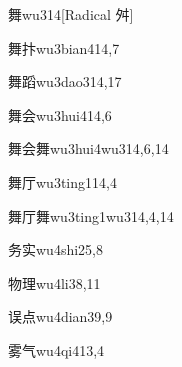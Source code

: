 \begin{verbete}{舞}{wu3}{14}[Radical 舛]
\end{verbete}

\begin{verbete}{舞抃}{wu3bian4}{14,7}
\end{verbete}

\begin{verbete}{舞蹈}{wu3dao3}{14,17}
\end{verbete}

\begin{verbete}{舞会}{wu3hui4}{14,6}
\end{verbete}

\begin{verbete}{舞会舞}{wu3hui4wu3}{14,6,14}
\end{verbete}

\begin{verbete}{舞厅}{wu3ting1}{14,4}
\end{verbete}

\begin{verbete}{舞厅舞}{wu3ting1wu3}{14,4,14}
\end{verbete}

\begin{verbete}{务实}{wu4shi2}{5,8}
\end{verbete}

\begin{verbete}{物理}{wu4li3}{8,11}
\end{verbete}

\begin{verbete}{误点}{wu4dian3}{9,9}
\end{verbete}

\begin{verbete}{雾气}{wu4qi4}{13,4}
\end{verbete}


